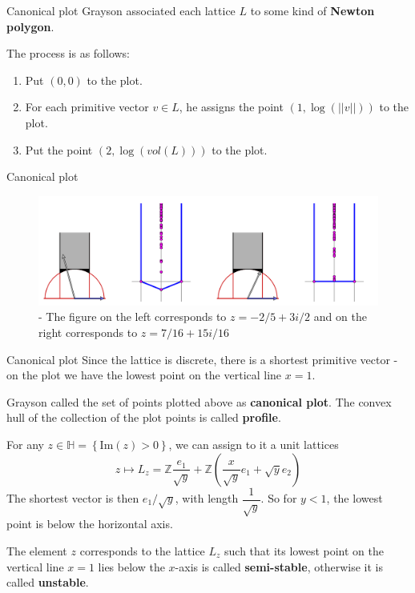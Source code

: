 \documentclass[pdf]{beamer}
\begin{document}
\begin{frame}{Canonical plot}
    Grayson \cite{grayson1984reduction} associated each lattice $L$ to some kind of \textbf{Newton polygon}. \pause

    The process is as follows:
    \begin{enumerate}
        \item Put $(0,0)$ to the plot.
        \item For each primitive vector $v \in L$, he assigns the point $(1,\log(||v||))$ to the plot.
        \item Put the point $(2,\log(vol(L)))$ to the plot.
    \end{enumerate}
\end{frame}
\begin{frame}{Canonical plot}
    \begin{figure}[h]
        \includegraphics[width = \textwidth]{Canonical plot.png}
        \caption{\cite{casselman2004stability} - The figure on the left corresponds to $z = -2/5 +3i/2$ and on the right corresponds to $z = 7/16+15i/16$ }
    \end{figure}
\end{frame}
\begin{frame}{Canonical plot}
    Since the lattice is discrete, there is a shortest primitive vector - on the plot we have the lowest point on the vertical line $x=1$.\pause\vspace{3em}

    Grayson called the set of points plotted above as \textbf{canonical plot}. The convex hull of the collection
    of the plot points is called \textbf{profile}.
\end{frame}
\begin{frame}
    For any $z \in \mathbb{H} = \left\lbrace \text{Im}(z)>0 \right\rbrace$, we can assign to it a unit lattices
    \[z \mapsto L_z = \mathbb{Z}\dfrac{e_1}{\sqrt{y}} + \mathbb{Z}\left(\dfrac{x}{\sqrt{y}}e_1+\sqrt{y}e_2 \right)\]
    The shortest vector is then $ e_1/\sqrt{y}$, with length $\dfrac{1}{\sqrt{y}}$. So for $y<1$, the lowest
    point is below the horizontal axis.
    \pause \vspace{2em}

    The element $z$ corresponds to the lattice $L_z$ such that its lowest point on the
    vertical line $x=1$ lies below the $x$-axis is called \textbf{semi-stable}, otherwise it is called \textbf{unstable}.
\end{frame}
\end{document}
